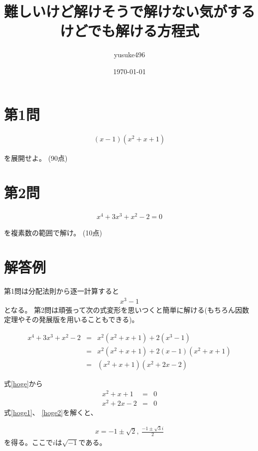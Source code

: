 \documentclass[11pt,a4paper]{jsarticle}
\title{難しいけど解けそうで解けない気がするけどでも解ける方程式}
\author{yusuke496}
\date{\today}
\begin{document}
\maketitle

\section*{第1問}

\begin{eqnarray}
    (x-1)(x^2+x+1)
\end{eqnarray}

を展開せよ。
(90点)

\section*{第2問}

\begin{eqnarray}
    x^4+3x^3+x^2-2=0
\end{eqnarray}

を複素数の範囲で解け。
(10点)

\newpage
\section*{解答例}
第1問は分配法則から逐一計算すると
\begin{eqnarray}
    x^3-1 \nonumber
\end{eqnarray}
となる。
第2問は頑張って次の式変形を思いつくと簡単に解ける(もちろん因数定理やその発展版を用いることもできる)。

\begin{eqnarray}
    x^4+3x^3+x^2-2&=&x^2(x^2+x+1)+2(x^3-1) \nonumber \\ 
    &=&x^2(x^2+x+1)+2(x-1)(x^2+x+1) \nonumber \\
    \label{hoge}
    &=&(x^2+x+1)(x^2+2x-2)
\end{eqnarray}

式\ref{hoge}から
\begin{eqnarray}
    \label{hoge1}
    x^2+x+1&=&0\\
    \label{hoge2}
    x^2+2x-2&=&0
\end{eqnarray}
式\ref{hoge1}、 \ref{hoge2}を解くと、

\begin{eqnarray}
    x=-1\pm \sqrt{2},\ \frac{-1\pm \sqrt{3}i}{2} \nonumber
\end{eqnarray}
を得る。ここで$i$は$\sqrt{-1}$である。
\end{document}
